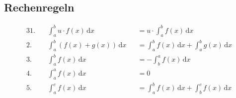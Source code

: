 \subsection{Rechenregeln}

\begin{gesetz}
	\begin{alignat*}{3}
		\text{1.}\quad & \int_a^b u \cdot f(x) \,\mathrm{d}x               &  & = u \cdot \int_a^b f(x) \,\mathrm{d}x                       \\
		\text{2.}\quad & \int_a^b \left( f(x) + g(x) \right) \,\mathrm{d}x &  & = \int_a^b f(x) \,\mathrm{d}x + \int_a^b g(x) \,\mathrm{d}x \\
		\text{3.}\quad & \int_a^b f(x) \,\mathrm{d}x                       &  & = -\int_b^a f(x) \,\mathrm{d}x                              \\
		\text{4.}\quad & \int_a^a f(x) \,\mathrm{d}x                       &  & = 0                                                         \\
		\text{5.}\quad & \int_a^c f(x) \,\mathrm{d}x                       &  & = \int_a^b f(x) \,\mathrm{d}x + \int_b^c f(x) \,\mathrm{d}x
	\end{alignat*}
\end{gesetz}
